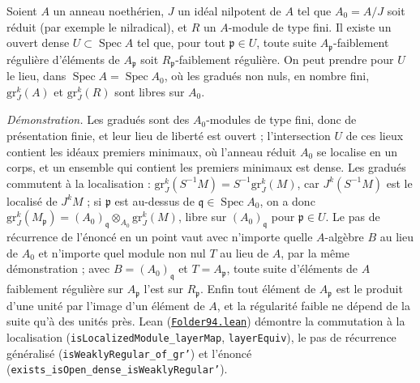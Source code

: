 \begin{encadre}
\begin{theoreme*}[Grothendieck, pages 8 et 9, l'ouvert dense pour $X = S$\piste{94-generic-tor-regular-sequences}]
Soient $A$ un anneau noethérien, $J$ un idéal nilpotent de $A$ tel que $A_0 = A/J$ soit réduit (par exemple le nilradical), et $R$ un $A$-module de type fini. Il existe un ouvert dense $U \subset \operatorname{Spec} A$ tel que, pour tout $\mathfrak p \in U$, toute suite $A_{\mathfrak p}$-faiblement régulière d'éléments de $A_{\mathfrak p}$ soit $R_{\mathfrak p}$-faiblement régulière. On peut prendre pour $U$ le lieu, dans $\operatorname{Spec} A = \operatorname{Spec} A_0$, où les gradués non nuls, en nombre fini, $\mathrm{gr}^k_J(A)$ et $\mathrm{gr}^k_J(R)$ sont libres sur $A_0$.
\end{theoreme*}
\end{encadre}
{\small \emph{Démonstration.} Les gradués sont des $A_0$-modules de type fini, donc de présentation finie, et leur lieu de liberté est ouvert ; l'intersection $U$ de ces lieux contient les idéaux premiers minimaux, où l'anneau réduit $A_0$ se localise en un corps, et un ensemble qui contient les premiers minimaux est dense. Les gradués commutent à la localisation : $\mathrm{gr}^k_J(S^{-1}M) = S^{-1}\mathrm{gr}^k_J(M)$, car $J^k(S^{-1}M)$ est le localisé de $J^kM$ ; si $\mathfrak p$ est au-dessus de $\mathfrak q \in \operatorname{Spec} A_0$, on a donc $\mathrm{gr}^k_J(M_{\mathfrak p}) = (A_0)_{\mathfrak q} \otimes_{A_0} \mathrm{gr}^k_J(M)$, libre sur $(A_0)_{\mathfrak q}$ pour $\mathfrak p \in U$. Le pas de récurrence de l'énoncé en un point vaut avec n'importe quelle $A$-algèbre $B$ au lieu de $A_0$ et n'importe quel module non nul $T$ au lieu de $A$, par la même démonstration ; avec $B = (A_0)_{\mathfrak q}$ et $T = A_{\mathfrak p}$, toute suite d'éléments de $A$ faiblement régulière sur $A_{\mathfrak p}$ l'est sur $R_{\mathfrak p}$. Enfin tout élément de $A_{\mathfrak p}$ est le produit d'une unité par l'image d'un élément de $A$, et la régularité faible ne dépend de la suite qu'à des unités près. Lean (\href{\leanblob/RingTheory/Folder94.lean}{\texttt{Folder94.\allowbreak{}lean}}) démontre la commutation à la localisation (\texttt{isLocalizedModule\_layerMap}, \texttt{layerEquiv}), le pas de récurrence généralisé (\texttt{isWeaklyRegular\_of\_gr'}) et l'énoncé (\texttt{exists\_isOpen\_dense\_isWeaklyRegular'}).\par}

